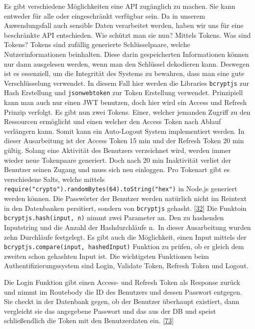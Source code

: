 \documentclass[
    headings=optiontotocandhead,%
    twoside,
    numbers=noenddot,%
    12pt, %
    titlepage, %
    parskip=full, %
    listof=leveldown, 
    numbers=noenddot, %
    a4paper,DIV=14,
    BCOR=15mm,
]{scrbook}
\newcommand{\passthrough}[1]{#1}
\begin{document}
Es gibt verschiedene Möglichkeiten eine API zugänglich zu machen. Sie
kann entweder für alle oder eingeschränkt verfügbar sein. Da in unserem
Anwendungsfall auch sensible Daten verarbeitet werden, haben wir uns für
eine beschränkte API entschieden. Wie schützt man sie nun? Mittels
Tokens. Was sind Tokens? Tokens sind zufällig generierte Schlüsselpaare,
welche Nutzerinformationen beinhalten. Diese darin gespeicherten
Informationen können nur dann ausgelesen werden, wenn man den Schlüssel
dekodieren kann. Deswegen ist es essenziell, um die Integrität des
Systems zu bewahren, dass man eine gute Verschlüsselung verwendet. In
diesem Fall hier werden die Libraries \passthrough{\lstinline!bcryptjs!}
zur Hash Erstellung und \passthrough{\lstinline!jsonwebtoken!} zur Token
Erstellung verwendet. Prinzipiell kann man auch nur einen JWT benutzen,
doch hier wird ein Access und Refresh Prinzip verfolgt. Es gibt nun zwei
Tokens. Einer, welcher jemanden Zugriff zu den Ressourcen ermöglicht und
einen welcher den Access Token nach Ablauf verlängern kann. Somit kann
ein Auto-Logout System implementiert werden. In dieser Ausarbeitung ist
der Access Token 15 min und der Refresh Token 20 min gültig. Solang eine
Aktivität des Benutzers verzeichnet wird, werden immer wieder neue
Tokenpaare generiert. Doch nach 20 min Inaktivität verliet der Benutzer
seinen Zugang und muss sich neu einloggen. Pro Tokenart gibt es
verschiedene Salts, welche mittels
\passthrough{\lstinline!require("crypto").randomBytes(64).toString("hex")!}
in Node.js generiert werden können. Die Passwörter der Benutzer werden
natürlich nicht im Reintext in den Datenbanken persitiert, sondern von
\passthrough{\lstinline!bcryptjs!} gehasht.
{[}\protect\hyperlink{ref-medium-auth-simple}{32}{]} Die Funktoin
\passthrough{\lstinline!bcryptjs.hash(input, n)!} nimmt zwei Parameter
an. Den zu hashenden Inputstring und die Anzahl der Hashdurchläufe n.~In
dieser Ausarbeitung wurden zehn Durchläufe festgelegt. Es gibt auch die
Möglichkeit, einen Input mittels der
\passthrough{\lstinline!bcryptjs.compare(input, hashedInput)!} Funktion
zu prüfen, ob er gleich dem zweiten schon gehashten Input ist. Die
wichtigsten Funktionen beim Authentifizierungssystem sind Login,
Validate Token, Refresh Token und Logout.

Die Login Funktion gibt einen Access- und Refresh Token als Response
zurück und nimmt im Routebody die ID des Benutzers und dessen Passwort
entgegen. Sie checkt in der Datenbank gegen, ob der Benutzer überhaupt
existiert, dann vergleicht sie das angegebene Passwort und das aus der
DB und speist schließendlich die Token mit den Benutzerdaten ein.
{[}\protect\hyperlink{ref-medium-auth-mysql}{73}{]}
\end{document}
